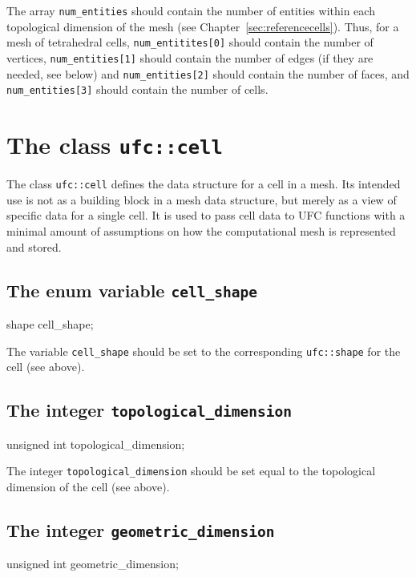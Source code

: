 The array \texttt{num\_entities} should contain the number of entities
within each topological dimension of the mesh (see
Chapter~\ref{sec:referencecells}). Thus, for a mesh of tetrahedral
cells, \texttt{num\_entitites[0]} should contain the number of
vertices, \texttt{num\_entities[1]} should contain the number of edges
(if they are needed, see below) and \texttt{num\_entities[2]} should
contain the number of faces, and \texttt{num\_entities[3]} should
contain the number of cells.

\section{The class \texttt{ufc::cell}}

The class \texttt{ufc::cell} defines the data structure for a cell in
a mesh. Its intended use is not as a building block in a mesh data
structure, but merely as a view of specific data for a single cell.
It is used to pass cell data to UFC functions with a minimal amount of
assumptions on how the computational mesh is represented and stored.

\subsection{The enum variable \texttt{cell\_shape}}

\begin{code}
shape cell_shape;
\end{code}

The variable \texttt{cell\_shape} should be set to the corresponding
\texttt{ufc::shape} for the cell (see above).

\subsection{The integer \texttt{topological\_dimension}}

\begin{code}
unsigned int topological_dimension;
\end{code}

The integer \texttt{topological\_dimension} should be set equal to the
topological dimension of the cell (see above).

\subsection{The integer \texttt{geometric\_dimension}}

\begin{code}
unsigned int geometric_dimension;
\end{code}

